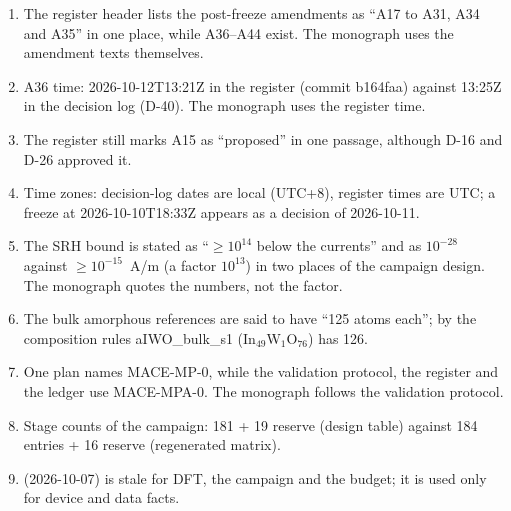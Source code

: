\begin{enumerate}
\item The register header lists the post-freeze amendments as ``A17 to A31, A34 and A35'' in one place, while A36--A44
exist. The monograph uses the amendment texts themselves.
\item A36 time: 2026-10-12T13:21Z in the register (commit b164faa) against 13:25Z in the decision log (D-40). The
monograph uses the register time.
\item The register still marks A15 as ``proposed'' in one passage, although D-16 and D-26 approved it.
\item Time zones: decision-log dates are local (UTC+8), register times are UTC; a freeze at 2026-10-10T18:33Z appears
as a decision of 2026-10-11.
\item The SRH bound is stated as ``$\geq10^{14}$ below the currents'' and as $10^{-28}$ against $\geq10^{-15}$~A/\textmu m
(a factor $10^{13}$) in two places of the campaign design. The monograph quotes the numbers, not the factor.
\item The bulk amorphous references are said to have ``125 atoms each''; by the composition rules aIWO\_bulk\_s1
(In$_{49}$W$_1$O$_{76}$) has 126.
\item One plan names MACE-MP-0, while the validation protocol, the register and the ledger use MACE-MPA-0. The
monograph follows the validation protocol.
\item Stage counts of the campaign: 181 + 19 reserve (design table) against 184 entries + 16 reserve (regenerated matrix).
\item {} (2026-10-07) is stale for DFT, the campaign and the budget; it is used only for device and
data facts.
\end{enumerate}
